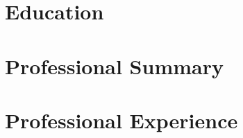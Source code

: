 \documentclass[11pt,a4paper]{article}
\begin{document}
\begin{center}
\begin{minipage}[t]{0.7\textwidth}
\begin{flushleft}
            \vspace{0.5em}
            \begin{center}
                \color{white} \color{white} \location
            \end{center}
        \end{flushleft}
    \end{minipage}
\end{center}

\vspace{2.5em}

\vspace{1em}

\section{Education}

\subsection{\degree}
\textit{\institution} \hfill \textit{\educationPeriod}
\begin{itemize}
    \education
\end{itemize}
\educationSkills

\subsection{\degreeTwo}
\textit{\institutionTwo} \hfill \textit{\educationPeriodTwo}
\begin{itemize}
    \educationTwo
\end{itemize}
\educationSkillsTwo

\section{Professional Summary}
\summary

\section{Professional Experience}

\subsection{\positionTitle}
\textit{\positionLocation} \hfill \textit{\positionPeriod}
\begin{itemize}
    \positionExperience
\end{itemize}
\positionSkills
\end{document}
